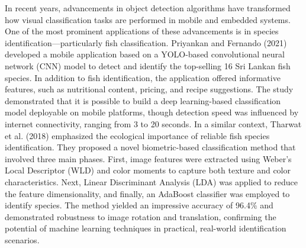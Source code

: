 In recent years, advancements in object detection algorithms have transformed how visual classification tasks are performed in mobile and embedded systems. One of the most prominent applications of these advancements is in species identification—particularly fish classification. Priyankan and Fernando (2021) developed a mobile application based on a YOLO-based convolutional neural network (CNN) model to detect and identify the top-selling 16 Sri Lankan fish species. In addition to fish identification, the application offered informative features, such as nutritional content, pricing, and recipe suggestions. The study demonstrated that it is possible to build a deep learning-based classification model deployable on mobile platforms, though detection speed was influenced by internet connectivity, ranging from 3 to 20 seconds. In a similar context, Tharwat et al. (2018) emphasized the ecological importance of reliable fish species identification. They proposed a novel biometric-based classification method that involved three main phases. First, image features were extracted using Weber’s Local Descriptor (WLD) and color moments to capture both texture and color characteristics. Next, Linear Discriminant Analysis (LDA) was applied to reduce the feature dimensionality, and finally, an AdaBoost classifier was employed to identify species. The method yielded an impressive accuracy of 96.4\% and demonstrated robustness to image rotation and translation, confirming the potential of machine learning techniques in practical, real-world identification scenarios.

